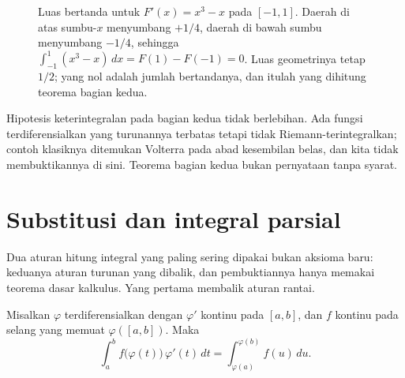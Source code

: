 \begin{figure}[htbp]
\centering
{}
\caption{Luas bertanda untuk $F'(x)=x^3-x$ pada $[-1,1]$. Daerah di atas sumbu-$x$
menyumbang $+1/4$, daerah di bawah sumbu menyumbang $-1/4$, sehingga
$\int_{-1}^{1}(x^3-x)\,dx=F(1)-F(-1)=0$. Luas geometrinya tetap $1/2$; yang nol adalah
jumlah bertandanya, dan itulah yang dihitung teorema bagian kedua.}
\label{fig:luas-bertanda}
\end{figure}

Hipotesis keterintegralan pada bagian kedua tidak berlebihan. Ada fungsi
terdiferensialkan yang turunannya terbatas tetapi tidak Riemann-terintegralkan; contoh
klasiknya ditemukan Volterra pada abad kesembilan belas, dan kita tidak
membuktikannya di sini. Teorema bagian kedua bukan pernyataan tanpa syarat.

\section{Substitusi dan integral parsial}

Dua aturan hitung integral yang paling sering dipakai bukan aksioma baru: keduanya
aturan turunan yang dibalik, dan pembuktiannya hanya memakai teorema dasar kalkulus.
Yang pertama membalik aturan rantai.

\begin{proposisi}[Substitusi]
Misalkan $\varphi$ terdiferensialkan dengan $\varphi'$ kontinu pada $[a,b]$, dan $f$
kontinu pada selang yang memuat $\varphi([a,b])$. Maka
\[
\int_a^b f\bigl(\varphi(t)\bigr)\,\varphi'(t)\,dt
=\int_{\varphi(a)}^{\varphi(b)}f(u)\,du .
\]
\end{proposisi}


